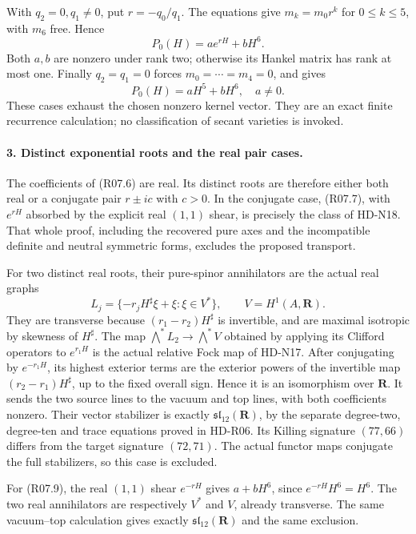With $q_2=0,q_1\ne0$, put $r=-q_0/q_1$. The equations give
$m_k=m_0r^k$ for $0\le k\le5$, with $m_6$ free. Hence
\[
                         P_0(H)=a e^{rH}+bH^6.               \tag{R07.9}
\]
Both $a,b$ are nonzero under rank two; otherwise its Hankel
matrix has rank at most one. Finally $q_2=q_1=0$ forces
$m_0=\cdots=m_4=0$, and gives
\[
                         P_0(H)=aH^5+bH^6,\quad a\ne0.       \tag{R07.10}
\]
These cases exhaust the chosen nonzero kernel vector. They are
an exact finite recurrence calculation; no classification of
secant varieties is invoked.

\paragraph{3. Distinct exponential roots and the real pair cases.}
The coefficients of (R07.6) are real. Its distinct roots are
therefore either both real or a conjugate pair $r\pm ic$ with
$c>0$. In the conjugate case, (R07.7), with $e^{rH}$ absorbed
by the explicit real $(1,1)$ shear, is precisely the class of
HD-N18. That whole proof, including the recovered pure axes and
the incompatible definite and neutral symmetric forms, excludes
the proposed transport.

For two distinct real roots, their pure-spinor annihilators are
the actual real graphs
\[
             L_j=\{-r_jH^\sharp\xi+\xi:\xi\in V^*\},
                    \qquad V=H^1(A,\mathbf R).
\]
They are transverse because $(r_1-r_2)H^\sharp$ is invertible,
and are maximal isotropic by skewness of $H^\sharp$.
The map $\bigwedge^*L_2\to\bigwedge^*V$ obtained by applying
its Clifford operators to $e^{r_1H}$ is the actual relative Fock
map of HD-N17. After conjugating by $e^{-r_1H}$, its highest
exterior terms are the exterior powers of the invertible map
$(r_2-r_1)H^\sharp$, up to the fixed overall sign. Hence it
is an isomorphism over $\mathbf R$. It sends the two source
lines to the vacuum and top lines, with both coefficients nonzero.
Their vector stabilizer is exactly
$\mathfrak{sl}_{12}(\mathbf R)$, by the separate degree-two,
degree-ten and trace equations proved in HD-R06. Its Killing
signature $(77,66)$ differs from the target signature $(72,71)$.
The actual functor maps conjugate the full stabilizers, so this
case is excluded.

For (R07.9), the real $(1,1)$ shear $e^{-rH}$ gives
$a+bH^6$, since $e^{-rH}H^6=H^6$. The two real annihilators
are respectively $V^*$ and $V$, already transverse. The same
vacuum--top calculation gives exactly
$\mathfrak{sl}_{12}(\mathbf R)$ and the same exclusion.

